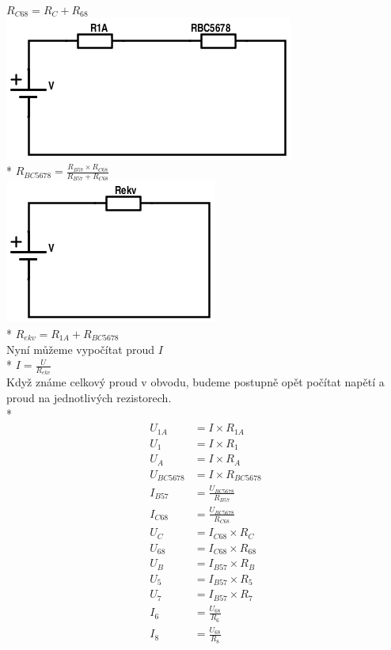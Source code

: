 \documentclass[a4paper, 10pt, fleqn]{article}
\begin{document}
 $R_{C68} = R_{C} + R_{68}$ \\
\includegraphics[scale=1]{IEL_OBR/1e.png}\\*
 $R_{BC5678} = \frac{R_{B57} \times R_{C68}}{R_{B57} + R_{C68}}$ \\
\includegraphics[scale=1]{IEL_OBR/1f.png}\\*
 $R_{ekv} = R_{1A} + R_{BC5678}$ \\
 Nyní můžeme vypočítat proud $I$ \\*
 $I = \frac{U}{R_{ekv}}$ \\
 Když známe celkový proud v obvodu, budeme postupně opět počítat napětí a proud
 na jednotlivých rezistorech. \\*
\begin{align*}
 U_{1A} &= I \times R_{1A} \\
 U_{1} &= I \times R_{1} \\
 U_{A} &= I \times R_{A} \\
 U_{BC5678} &= I \times R_{BC5678} \\
 I_{B57} &= \frac{U_{BC5678}}{R_{B57}} \\
 I_{C68} &= \frac{U_{BC5678}}{R_{C68}} \\
 U_{C} &= I_{C68} \times R_{C} \\
 U_{68} &= I_{C68} \times R_{68} \\
 U_{B} &= I_{B57} \times R_{B} \\
 U_{5} &= I_{B57} \times R_{5} \\
 U_{7} &= I_{B57} \times R_{7} \\
 I_{6} &= \frac{U_{68}}{R_{6}} \\
 I_{8} &= \frac{U_{68}}{R_{8}} \\
\end{align*}
\end{document}
